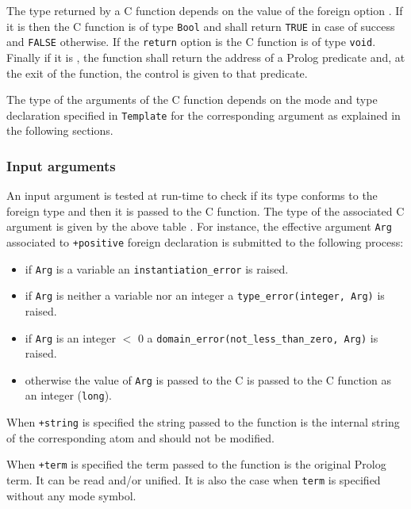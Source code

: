 The type returned by a C function depends on the value of the
 foreign option . If it is
 then the C function is of type \texttt{Bool} and shall
return \texttt{TRUE} in case of success and \texttt{FALSE} otherwise. If the
\texttt{return} option is  the C function is of type
\texttt{void}. Finally if it is , the function shall return the
address of a Prolog predicate and, at the exit of the function, the control
is given to that predicate.

The type of the arguments of the C function depends on the mode and type
declaration specified in \texttt{Template} for the corresponding argument as
explained in the following sections.

\subsubsection{Input arguments}
\label{Input-arguments}
An input argument is tested at run-time to check if its type conforms to the
foreign type and then it is passed to the C function. The type of the
associated C argument is given by the above table . For instance, the effective argument \texttt{Arg} associated to
\texttt{+positive} foreign declaration is submitted to the following
process:

\begin{itemize}

\item if \texttt{Arg} is a variable an \texttt{instantiation\_error} is
raised.

\item if \texttt{Arg} is neither a variable nor an integer a
\texttt{type\_error(integer, Arg)} is raised.

\item if \texttt{Arg} is an integer $<$ 0 a
\texttt{domain\_error(not\_less\_than\_zero, Arg)} is raised.

\item otherwise the value of \texttt{Arg} is passed to the C is passed to
the C function as an integer (\texttt{long}).

\end{itemize}

When \texttt{+string} is specified the string passed to the function is the
internal string of the corresponding atom and should not be modified.

When \texttt{+term} is specified the term passed to the function is the
original Prolog term. It can be read and/or unified. It is also the case
when \texttt{term} is specified without any mode symbol.

